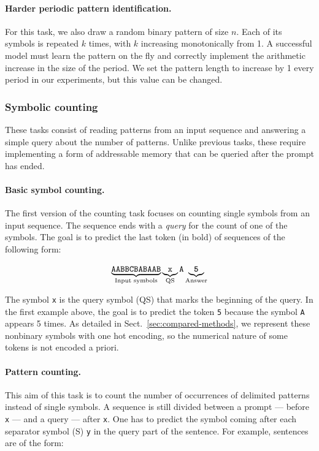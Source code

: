 \paragraph{Harder periodic pattern identification.}

For this task, we also draw a random binary pattern of size $n$. Each of its
symbols is repeated $k$ times, with $k$ increasing monotonically from 1. A
successful model must learn the pattern on the fly and correctly implement the
arithmetic increase in the size of the period. We set the pattern length to increase by
1 every period in our experiments, but this value can be changed.

\subsubsection{Symbolic counting}

These tasks consist of reading patterns from an input sequence and answering a
simple query about the number of patterns. Unlike previous tasks, these
require implementing a form of addressable memory that can be queried after the prompt has
ended.

\paragraph{Basic symbol counting.}
The first version of the counting task focuses on counting single symbols from
an input sequence. The sequence ends with a \emph{query} for the count of
one of the symbols. The goal is to predict the last token (in bold) of sequences
of the following form:

\begin{align*}
  \underbrace{\texttt{\textsc{AABBCBABAAB}}}_{\text{Input symbols}}
  & \underbrace{\texttt{x}}_{\text{QS}} \texttt{A}
    \underbrace{\textbf{\texttt{5}}}_{\text{Answer}} \\
\end{align*}

The symbol \texttt{x} is the query symbol (QS) that marks the beginning of the
query. In the first example above, the goal is to predict the token \texttt{5}
because the symbol \texttt{A} appears 5 times. As detailed in
Sect.~\ref{sec:compared-methods}, we represent these nonbinary symbols with
one hot encoding, so the numerical nature of some tokens is not encoded a priori.

\paragraph{Pattern counting.}
This aim of this task is to count the number of occurrences of delimited patterns
instead of single symbols. A sequence is still divided between a prompt --- before
\texttt{x} --- and a query --- after \texttt{x}. One has to predict the symbol
coming after each separator symbol (S) \texttt{y} in the query part of the
sentence. For example, sentences are of the form:

